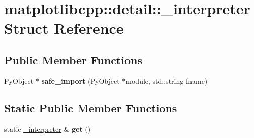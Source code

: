 \hypertarget{structmatplotlibcpp_1_1detail_1_1__interpreter}{}\section{matplotlibcpp\+:\+:detail\+:\+:\+\_\+interpreter Struct Reference}
\label{structmatplotlibcpp_1_1detail_1_1__interpreter}
\subsection*{Public Member Functions}
\begin{DoxyCompactItemize}
\item 
Py\+Object $\ast$ {\bfseries safe\+\_\+import} (Py\+Object $\ast$module, std\+::string fname)\hypertarget{structmatplotlibcpp_1_1detail_1_1__interpreter_aa717a5aaf418cda0430f2e4227ca8480}{}\label{structmatplotlibcpp_1_1detail_1_1__interpreter_aa717a5aaf418cda0430f2e4227ca8480}

\end{DoxyCompactItemize}
\subsection*{Static Public Member Functions}
\begin{DoxyCompactItemize}
\item 
static \hyperlink{structmatplotlibcpp_1_1detail_1_1__interpreter}{\+\_\+interpreter} \& {\bfseries get} ()\hypertarget{structmatplotlibcpp_1_1detail_1_1__interpreter_a3ddc4e50c23738307da3dc64c47cdbc0}{}\label{structmatplotlibcpp_1_1detail_1_1__interpreter_a3ddc4e50c23738307da3dc64c47cdbc0}

\end{DoxyCompactItemize}
